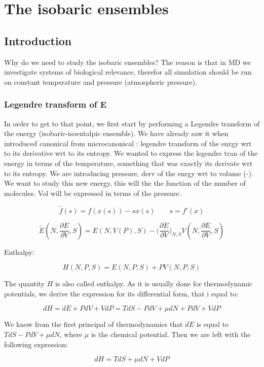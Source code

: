 \graphicspath{{chapters/12/images/}}
\chapter{The isobaric ensembles}

\section{Introduction}
Why do we need to study the isobaric ensembles? The reason is that in MD we investigate systems of biological relevance, therefor all simulation should be run on constant temperature and pressure (atmospheric pressure).  
	\subsection{Legendre transform of E}
	In order to get to that point, we first start by performing a Legendre transform of the energy (isobaric-isoentalpic ensemble). 
We have already saw it when introduced canonical from microcanonical : legendre transform of the enrgy wrt to its derivative wrt to its entropy. We wanted to express the legendre tran of the energy in terms of the temperature, something that was exactly its derivate wrt to its entropy.
We are introducing pressure, derv of the enrgy wrt to volume (-). We want to study this new energy, this will the the function of the number of molecules. Vol will be expressed in terms of the pressure.

	$$\tilde{f}(s) = f(x(s))-sx(s)\qquad s = f'(x)$$

	$$\tilde{E}(N, \frac{\partial E}{\partial V}, S) = E(N, V(P), S) - \biggl(\frac{\partial E}{\partial V}\biggr)_{N, S}V(N, \frac{\partial E}{\partial V}, S)$$
	
	

	Enthalpy:

	$$H(N, P, S) = E(N, P, S) + PV(N, P, S)$$
	
	The quantity $H$ is also called enthalpy. As it is usually done for thermodynamic potentials, we derive the expression for its differential form, that i equal to:
	
	$$dH = dE + PdV + VdP = TdS - PdV + \mu dN + PdV + VdP$$
	
	We know from the first principal of thermodynamics that $dE$ is equal to $TdS - PdV + \mu dN$, where $\mu$ is the chemical potential. Then we are left with the following expression: 

	$$dH = TdS + \mu dN + VdP$$

